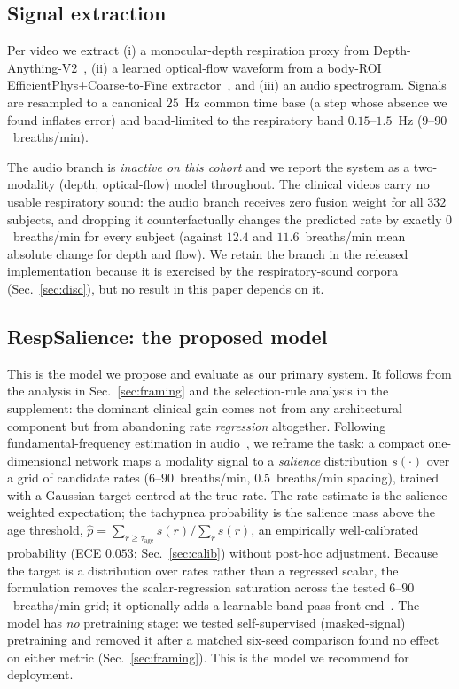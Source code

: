 \documentclass[journal]{IEEEtran}
\begin{document}
\subsection{Signal extraction}
Per video we extract (i) a monocular-depth respiration proxy from Depth-Anything-V2~\cite{yang_depthanythingv2},
(ii) a learned optical-flow waveform from a body-ROI EfficientPhys+Coarse-to-Fine
extractor~\cite{liu_efficientphys}, and (iii) an audio spectrogram. Signals are resampled to a canonical
$25$~Hz common time base (a step whose absence we found inflates error) and band-limited to the
respiratory band $0.15$--$1.5$~Hz ($9$--$90$~breaths/min).

The audio branch is \emph{inactive on this cohort} and we report the system as a two-modality
(depth, optical-flow) model throughout. The clinical videos carry no usable respiratory sound: the audio
branch receives zero fusion weight for all $332$ subjects, and dropping it counterfactually changes the
predicted rate by exactly $0$~breaths/min for every subject (against $12.4$ and $11.6$~breaths/min mean
absolute change for depth and flow). We retain the branch in the released implementation because it is
exercised by the respiratory-sound corpora (Sec.~\ref{sec:disc}), but no result in this paper depends on
it.

\subsection{RespSalience: the proposed model}\label{sec:respsal}
This is the model we propose and evaluate as our primary system. It follows from the analysis in
Sec.~\ref{sec:framing} and the selection-rule analysis in the supplement: the dominant clinical
gain comes not from any
architectural component but from abandoning rate \emph{regression} altogether. Following fundamental-frequency estimation in
audio~\cite{crepe,spice}, we reframe the task: a compact one-dimensional network maps a modality signal to
a \emph{salience} distribution $s(\cdot)$ over a grid of candidate rates ($6$--$90$~breaths/min,
$0.5$~breaths/min spacing), trained with a Gaussian target centred at the true rate. The rate estimate is
the salience-weighted expectation; the tachypnea probability is the salience mass above the age threshold,
$\hat p = \sum_{r \ge \tau_{\text{age}}} s(r) / \sum_r s(r)$, an empirically well-calibrated probability
(ECE $0.053$; Sec.~\ref{sec:calib}) without post-hoc adjustment. Because the target is a distribution over rates rather than a regressed scalar, the
formulation removes the scalar-regression saturation across the tested $6$--$90$~breaths/min grid; it optionally adds a learnable band-pass front-end~\cite{sincnet}.
The model has \emph{no} pretraining stage: we tested self-supervised (masked-signal) pretraining and
removed it after a matched six-seed comparison found no effect on either metric
(Sec.~\ref{sec:framing}). This is the model we recommend for deployment.
\end{document}
